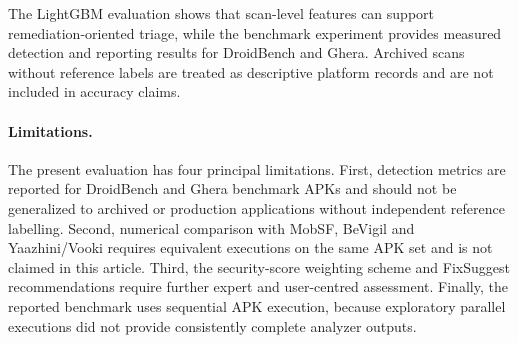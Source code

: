 The LightGBM evaluation shows that scan-level features can support
remediation-oriented triage, while the benchmark experiment provides measured
detection and reporting results for DroidBench and Ghera. Archived scans
without reference labels are treated as descriptive platform records and are
not included in accuracy claims.

\paragraph{Limitations.}
The present evaluation has four principal limitations. First, detection
metrics are reported for DroidBench and Ghera benchmark APKs and should not be
generalized to archived or production applications without independent
reference labelling. Second, numerical comparison with MobSF, BeVigil and
Yaazhini/Vooki requires equivalent executions on the same APK set and is not
claimed in this article. Third, the security-score weighting scheme and
FixSuggest recommendations require further expert and user-centred
assessment. Finally, the reported benchmark uses sequential APK execution,
because exploratory parallel executions did not provide consistently complete
analyzer outputs.
